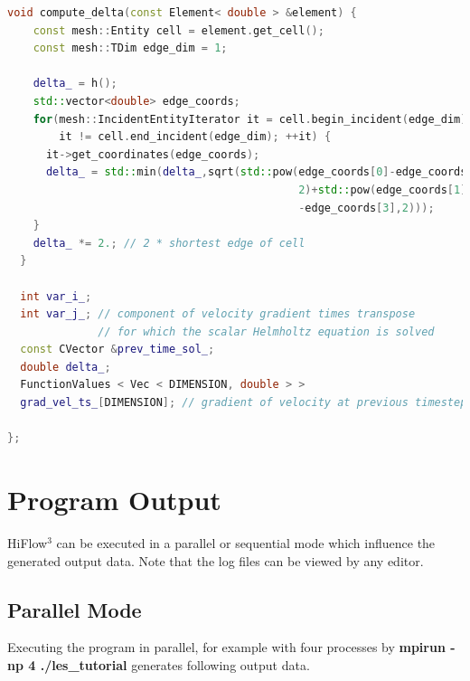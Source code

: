 \documentclass[a4paper, 11pt, twoside]{article}
\begin{document}
\begin{lstlisting}[language=C++, basicstyle={\footnotesize, \ttfamily}, keywordstyle=\color{blue},  numbers=none, tabsize=2]
  void compute_delta(const Element< double > &element) {
    const mesh::Entity cell = element.get_cell();
    const mesh::TDim edge_dim = 1;

    delta_ = h();
    std::vector<double> edge_coords;
    for(mesh::IncidentEntityIterator it = cell.begin_incident(edge_dim);
        it != cell.end_incident(edge_dim); ++it) {
      it->get_coordinates(edge_coords);
      delta_ = std::min(delta_,sqrt(std::pow(edge_coords[0]-edge_coords[2],
                                             2)+std::pow(edge_coords[1]
                                             -edge_coords[3],2)));
    }
    delta_ *= 2.; // 2 * shortest edge of cell
  }

  int var_i_;
  int var_j_; // component of velocity gradient times transpose 
              // for which the scalar Helmholtz equation is solved
  const CVector &prev_time_sol_;
  double delta_;
  FunctionValues < Vec < DIMENSION, double > >
  grad_vel_ts_[DIMENSION]; // gradient of velocity at previous timestep

};

\end{lstlisting}

\section{Program Output}
HiFlow$^3$ can be executed in a parallel or sequential mode which influence the generated output data. Note that the log files can be viewed by any editor.
\subsection{Parallel Mode}
Executing the program in parallel, for example with four processes by \textbf{mpirun -np 4 ./les\_tutorial}   
generates following output data. 
\end{document}
